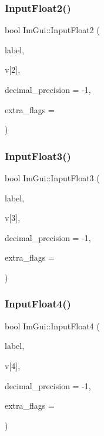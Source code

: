 \mbox{\label{namespace_im_gui_a0c7aea6408696de9696f38a2f32419c4}} 
\subsubsection{\texorpdfstring{Input\+Float2()}{InputFloat2()}}
{\footnotesize\ttfamily bool Im\+Gui\+::\+Input\+Float2 (\begin{DoxyParamCaption}\item[{const char $\ast$}]{label,  }\item[{float}]{v\mbox{[}2\mbox{]},  }\item[{int}]{decimal\+\_\+precision = {\ttfamily -\/1},  }\item[{\mbox{\hyperlink{imgui_8h_a7d2c6153a6b9b5d3178ce82434ac9fb8}{Im\+Gui\+Input\+Text\+Flags}}}]{extra\+\_\+flags = {} }\end{DoxyParamCaption})}

\mbox{\label{namespace_im_gui_a77e8d23f2e0477d11a7eb6b0aa773eb9}} 
\subsubsection{\texorpdfstring{Input\+Float3()}{InputFloat3()}}
{\footnotesize\ttfamily bool Im\+Gui\+::\+Input\+Float3 (\begin{DoxyParamCaption}\item[{const char $\ast$}]{label,  }\item[{float}]{v\mbox{[}3\mbox{]},  }\item[{int}]{decimal\+\_\+precision = {\ttfamily -\/1},  }\item[{\mbox{\hyperlink{imgui_8h_a7d2c6153a6b9b5d3178ce82434ac9fb8}{Im\+Gui\+Input\+Text\+Flags}}}]{extra\+\_\+flags = {} }\end{DoxyParamCaption})}

\mbox{\label{namespace_im_gui_a2c9bbb9a99bd8fee134a196fd1ec3dfb}} 
\subsubsection{\texorpdfstring{Input\+Float4()}{InputFloat4()}}
{\footnotesize\ttfamily bool Im\+Gui\+::\+Input\+Float4 (\begin{DoxyParamCaption}\item[{const char $\ast$}]{label,  }\item[{float}]{v\mbox{[}4\mbox{]},  }\item[{int}]{decimal\+\_\+precision = {\ttfamily -\/1},  }\item[{\mbox{\hyperlink{imgui_8h_a7d2c6153a6b9b5d3178ce82434ac9fb8}{Im\+Gui\+Input\+Text\+Flags}}}]{extra\+\_\+flags = {} }\end{DoxyParamCaption})}

